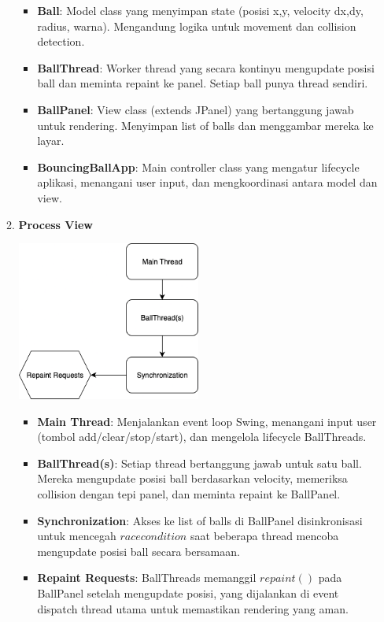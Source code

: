 \documentclass[a4paper]{article}
\begin{document}
\begin{enumerate}[itemsep=1em]
\begin{enumerate}[itemsep=1em]
    \begin{itemize}[itemsep=1em]
      \item \textbf{Ball}: Model class yang menyimpan state (posisi x,y, velocity dx,dy, radius, warna). Mengandung logika untuk movement dan collision detection.
      \item \textbf{BallThread}: Worker thread yang secara kontinyu mengupdate posisi ball dan meminta repaint ke panel. Setiap ball punya thread sendiri.
      \item \textbf{BallPanel}: View class (extends JPanel) yang bertanggung jawab untuk rendering. Menyimpan list of balls dan menggambar mereka ke layar.
      \item \textbf{BouncingBallApp}: Main controller class yang mengatur lifecycle aplikasi, menangani user input, dan mengkoordinasi antara model dan view.
    \end{itemize}
    \item \textbf{Process View}
    \begin{center}
      \includegraphics[width=0.5\textwidth,keepaspectratio]{bouncing-ball-process-view.png}
    \end{center}
    \begin{itemize}[itemsep=1em]
      \item \textbf{Main Thread}: Menjalankan event loop Swing, menangani input user (tombol add/clear/stop/start), dan mengelola lifecycle BallThreads.
      \item \textbf{BallThread(s)}: Setiap thread bertanggung jawab untuk satu ball. Mereka mengupdate posisi ball berdasarkan velocity, memeriksa collision dengan tepi panel, dan meminta repaint ke BallPanel.
      \item \textbf{Synchronization}: Akses ke list of balls di BallPanel disinkronisasi untuk mencegah \(race condition\) saat beberapa thread mencoba mengupdate posisi ball secara bersamaan.
      \item \textbf{Repaint Requests}: BallThreads memanggil \(repaint()\) pada BallPanel setelah mengupdate posisi, yang dijalankan di event dispatch thread utama untuk memastikan rendering yang aman.

\end{itemize}
\end{enumerate}
\end{enumerate}
\end{document}
